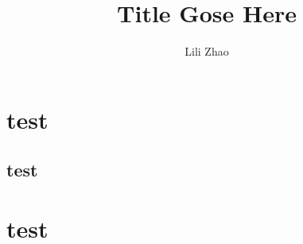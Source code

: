 \documentclass{book}
\title{Title Gose Here}
\author{Lili Zhao}
\begin{document}
\maketitle
\tableofcontents




\chapter{test}

\section{test}

\chapter{test}






















\end{document}
